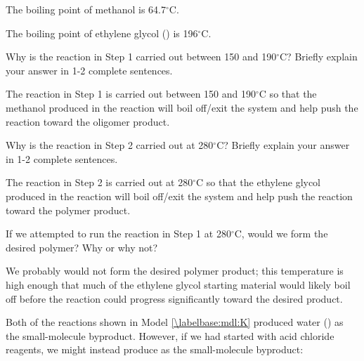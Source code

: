 \begin{activity}
\begin{ctqs}
\end{ctqs}

\begin{infobox}
	
	The boiling point of methanol is 64.7${}^\circ$C.
	
	The boiling point of ethylene glycol () is 196${}^\circ$C.
	
\end{infobox}

\begin{ctqs}
	
	\question Why is the reaction in Step 1 carried out between 150 and 190${}^\circ$C?  Briefly explain your answer in 1-2 complete sentences.
	
		\begin{solution}[2in]
			The reaction in Step 1 is carried out between 150 and 190${}^\circ$C so that the methanol produced in the reaction will boil off/exit the system and help push the reaction toward the oligomer product.
		\end{solution}
	
	\question Why is the reaction in Step 2 carried out at 280${}^\circ$C?  Briefly explain your answer in 1-2 complete sentences.
	
		\begin{solution}[2in]
			The reaction in Step 2 is carried out at 280${}^\circ$C so that the ethylene glycol produced in the reaction will boil off/exit the system and help push the reaction toward the polymer product.
		\end{solution}
	
	\question If we attempted to run the reaction in Step 1 at 280${}^\circ$C, would we form the desired polymer? Why or why not?
	
		\begin{solution}[2in]
			We probably would not form the desired polymer product; this temperature is high enough that much of the ethylene glycol starting material would likely boil off before the reaction could progress significantly toward the desired product.
		\end{solution}
		
\end{ctqs}
	


\begin{exercises}

		\exercise Both of the reactions shown in Model \ref{\labelbase:mdl:K} produced water () as the small-molecule byproduct.  However, if we had started with acid chloride reagents, we might instead produce  as the small-molecule byproduct:
		

\end{exercises}
\end{activity}
